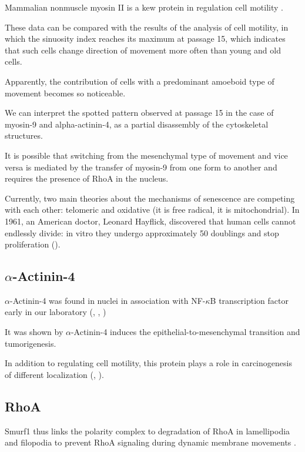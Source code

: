 \documentclass[alpha-refs]{wiley-article}
\begin{document}
Mammalian nonmuscle myosin II is a kew protein in regulation cell motility \cite{shutova2018mammalian}.

These data can be compared with the results of the analysis of cell motility, in which the sinuosity index reaches its maximum at passage 15, which indicates that such cells change direction of movement more often than young and old cells.

Apparently, the contribution of cells with a predominant amoeboid type of movement becomes so noticeable.

We can interpret the spotted pattern observed at passage 15 in the case of myosin-9 and alpha-actinin-4, as a partial disassembly of the cytoskeletal structures.

It is possible that switching from the mesenchymal type of movement and vice versa is mediated by the transfer of myosin-9 from one form to another and requires the presence of RhoA in the nucleus.

Currently, two main theories about the mechanisms of senescence are competing with each other: telomeric and oxidative (it is free radical, it is mitochondrial). In 1961, an American doctor, Leonard Hayflick, discovered that human cells cannot endlessly divide: in vitro they undergo approximately 50 doublings and stop proliferation (\cite{hayflick1961serial}).



\subsection*{$\alpha$-Actinin-4}

$\alpha$-Actinin-4 was found in nuclei in association with NF-$\kappa$B transcription factor early in our laboratory (\cite{babakov2008rela}, \cite{lomert2018co}, \cite{bolshakova2007extra})

It was shown by \cite{an2016alpha} $\alpha$-Actinin-4 induces the epithelial-to-mesenchymal transition and tumorigenesis.

In addition to regulating cell motility, this protein plays a role in carcinogenesis of different localization (\cite{barbolina2008motility}, \cite{hsu2013alpha}).

\subsection*{RhoA}

 Smurf1 thus links the polarity complex to degradation of RhoA in lamellipodia and filopodia to prevent RhoA signaling during dynamic membrane movements \cite{wang2003regulation}.
\end{document}
